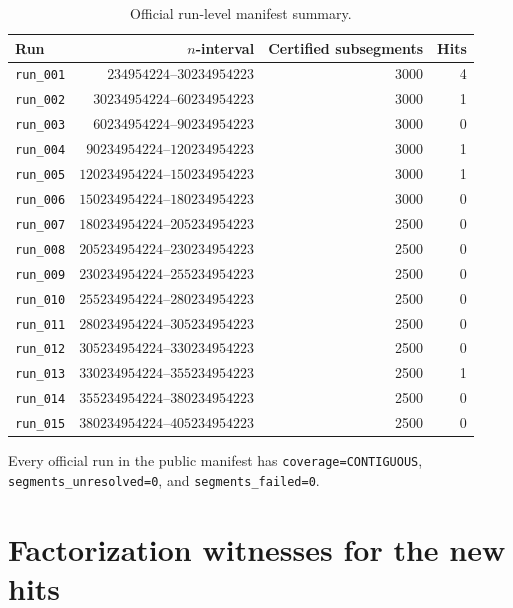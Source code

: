 \documentclass[11pt]{article}
\theoremstyle{definition}
\theoremstyle{remark}
\begin{document}
\begin{table}[ht]
\centering
\begin{tabular}{lrrr}
\toprule
Run & \(n\)-interval & Certified subsegments & Hits\\
\midrule
\texttt{run\_001} & \(234954224\)--\(30234954223\) & 3000 & 4\\
\texttt{run\_002} & \(30234954224\)--\(60234954223\) & 3000 & 1\\
\texttt{run\_003} & \(60234954224\)--\(90234954223\) & 3000 & 0\\
\texttt{run\_004} & \(90234954224\)--\(120234954223\) & 3000 & 1\\
\texttt{run\_005} & \(120234954224\)--\(150234954223\) & 3000 & 1\\
\texttt{run\_006} & \(150234954224\)--\(180234954223\) & 3000 & 0\\
\texttt{run\_007} & \(180234954224\)--\(205234954223\) & 2500 & 0\\
\texttt{run\_008} & \(205234954224\)--\(230234954223\) & 2500 & 0\\
\texttt{run\_009} & \(230234954224\)--\(255234954223\) & 2500 & 0\\
\texttt{run\_010} & \(255234954224\)--\(280234954223\) & 2500 & 0\\
\texttt{run\_011} & \(280234954224\)--\(305234954223\) & 2500 & 0\\
\texttt{run\_012} & \(305234954224\)--\(330234954223\) & 2500 & 0\\
\texttt{run\_013} & \(330234954224\)--\(355234954223\) & 2500 & 1\\
\texttt{run\_014} & \(355234954224\)--\(380234954223\) & 2500 & 0\\
\texttt{run\_015} & \(380234954224\)--\(405234954223\) & 2500 & 0\\
\bottomrule
\end{tabular}
\caption{Official run-level manifest summary.}
\label{tab:runmanifest}
\end{table}

\FloatBarrier

Every official run in the public manifest has
\texttt{coverage=CONTIGUOUS}, \texttt{segments\_unresolved=0}, and
\texttt{segments\_failed=0}.

\section{Factorization witnesses for the new hits}
\label{app:factors}
\end{document}
